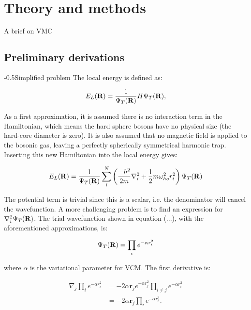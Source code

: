 \documentclass[english, a4paper]{article}
\makeatletter
\renewcommand{\subsubsection}{\@startsection{subsubsection}{3}{0pt}%
{-\baselineskip}{0.5\baselineskip}{\bf\large}}
\newcommand{\bm}[1]{\mathbf{#1}}
\makeatother
\begin{document}
\section{Theory and methods}

A brief on VMC

\subsection{Preliminary derivations}

\subsubsection{Simplified problem}
The local energy is defined as:

\begin{equation}
    E_L({\bf R})=\frac{1}{\Psi_T({\bf R})}H\Psi_T({\bf R}),
    \label{eq:locale}
\end{equation}

As a first approximation, it is assumed there is no interaction term in the Hamiltonian, which means the hard sphere bosons have no physical size (the hard-core diameter is zero). It is also assumed that no magnetic field is applied to the bosonic gas, leaving a perfectly spherically symmetrical harmonic trap. Inserting this new Hamiltonian into the local energy gives:

\begin{equation}
  E_L({\bf R})=\frac{1}{\Psi_T({\bf R})}\sum_i^N \left(
  \frac{-\hbar^2}{2m}
  \nabla_{i}^2 +
  \frac{1}{2}m\omega_{ho}^2r_i^2\right)\Psi_T({\bf R})
  \label{eq:localeInsertH}
\end{equation}

The potential term is trivial since this is a scalar, i.e. the denominator will cancel the wavefunction. A more challenging problem is to find an expression for $\nabla^2_i\Psi_T({\bf R})$. The trial wavefunction shown in equation (...), with the aforementioned approximations, is:

\begin{equation}
 \Psi_T({\bf R}) = \prod_i e^{-\alpha r_i^2}	\label{wavefunction_a}
\end{equation}

where $\alpha$ is the variational parameter for VCM. The first derivative is:

\begin{align}
 \nabla_j\prod_i e^{-\alpha r_i^2} 
 &= -2\alpha \bm{r}_j e^{-\alpha r_j^2} \prod_{i \neq j} e^{-\alpha r_i^2}\\
 &= -2\alpha \bm{r}_j  \prod_i e^{-\alpha r_i^2}.
 \label{E_L_first_derivative}
\end{align}
\end{document}
